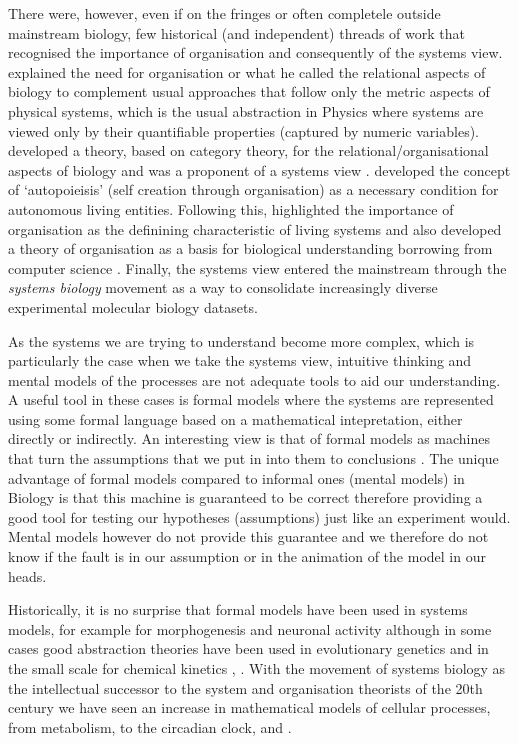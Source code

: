 \documentclass[phd]{infthesis}
\begin{document}
There were, however, even if on the fringes or often completele outside
mainstream biology, few historical (and independent) threads of work that
recognised the importance of organisation and consequently of the systems
view. \citet{rashevsky_topology_1954} explained the need for organisation or
what he called the relational aspects of biology to complement usual approaches
that follow only the metric aspects of physical systems, which is the usual
abstraction in Physics where systems are viewed only by their quantifiable
properties (captured by numeric variables). \citet{rosen_relational_1958}
developed a theory, based on category theory, for the relational/organisational
aspects of biology and was a proponent of a systems view
\citep{rosen1991life}. \citet{varela_autopoiesis:_1974} developed the concept of
`autopoieisis' (self creation through organisation) as a necessary condition for
autonomous living entities. Following this, \citet{fontana_what_1994}
highlighted the importance of organisation as the definining characteristic of
living systems and also developed a theory of organisation as a basis for
biological understanding borrowing from computer science
\citep[$\lambda$-calculus in particular;][]{fontana_barrier_1996}. Finally, the
systems view entered the mainstream through the \emph{systems biology} movement
\citep{kitano2002systems} as a way to consolidate increasingly diverse
experimental molecular biology datasets.

As the systems we are trying to understand become more complex, which is
particularly the case when we take the systems view, intuitive thinking and
mental models of the processes are not adequate tools to aid our
understanding. A useful tool in these cases is formal models where the systems
are represented using some formal language based on a mathematical
intepretation, either directly or indirectly. An interesting view is that of
formal models as machines that turn the assumptions that we put in into them to
conclusions \citep{gunawardena_models_2014}. The unique advantage of formal
models compared to informal ones (mental models) in Biology is that this machine
is guaranteed to be correct therefore providing a good tool for testing our
hypotheses (assumptions) just like an experiment would. Mental models however do
not provide this guarantee and we therefore do not know if the fault is in our
assumption or in the animation of the model in our heads.

Historically, it is no surprise that formal models have been used in systems
models, for example for morphogenesis \citep{turing_chemical_1952} and neuronal
activity \citep{hodgkin_quantitative_1952} although in some cases good
abstraction theories have been used in evolutionary genetics \citep[by
abstracting away the organism;][]{dobzhansky1982genetics} and in the small scale
for chemical kinetics \citep{michaelis1913kinetics, gunawardena_lessons_201},
\citep[see also;][]{gunawardena2013biology}. With the movement of systems
biology as the intellectual successor to the system and organisation theorists
of the 20th century we have seen an increase in mathematical models of cellular
processes, from metabolism, to the circadian clock, and .
\end{document}
